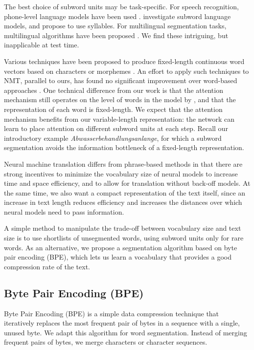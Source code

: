 \documentclass[11pt]{article}
\begin{document}
The best choice of subword units may be task-specific.
For speech recognition, phone-level language models have been used \cite{DBLP:conf/interspeech/BazziG00}.
 investigate subword language models, and propose to use syllables.
For multilingual segmentation tasks, multilingual algorithms have been proposed \cite{snyder-barzilay:2008:ACLMain}.
We find these intriguing, but inapplicable at test time.

Various techniques have been proposed to produce fixed-length continuous word vectors based on characters or morphemes \cite{DBLP:conf/conll/LuongSM13,Botha2014,ling15,DBLP:journals/corr/KimJSR15}.
An effort to apply such techniques to NMT, parallel to ours, has found no significant improvement over word-based approaches \cite{2015arXiv151104586L}.
One technical difference from our work is that the attention mechanism still operates on the level of words in the model by , and that the representation of each word is fixed-length.
We expect that the attention mechanism benefits from our variable-length representation: the network can learn to place attention on different subword units at each step.
Recall our introductory example \emph{Abwasserbehandlungsanlange}, for which a subword segmentation avoids the information bottleneck of a fixed-length representation.

Neural machine translation differs from phrase-based methods in that there are strong incentives to minimize the vocabulary size of neural models to increase time and space efficiency, and to allow for translation without back-off models.
At the same time, we also want a compact representation of the text itself, since an increase in text length reduces efficiency and increases the distances over which neural models need to pass information.

A simple method to manipulate the trade-off between vocabulary size and text size is to use shortlists of unsegmented words, using subword units only for rare words.
As an alternative, we propose a segmentation algorithm based on byte pair encoding (BPE), which lets us learn a vocabulary that provides a good compression rate of the text.

\subsection{Byte Pair Encoding (BPE)}

Byte Pair Encoding (BPE) \cite{Gage:1994:NAD:177910.177914} is a simple data compression technique that iteratively replaces the most frequent pair of bytes in a sequence with a single, unused byte.
We adapt this algorithm for word segmentation.
Instead of merging frequent pairs of bytes, we merge characters or character sequences.
\end{document}
